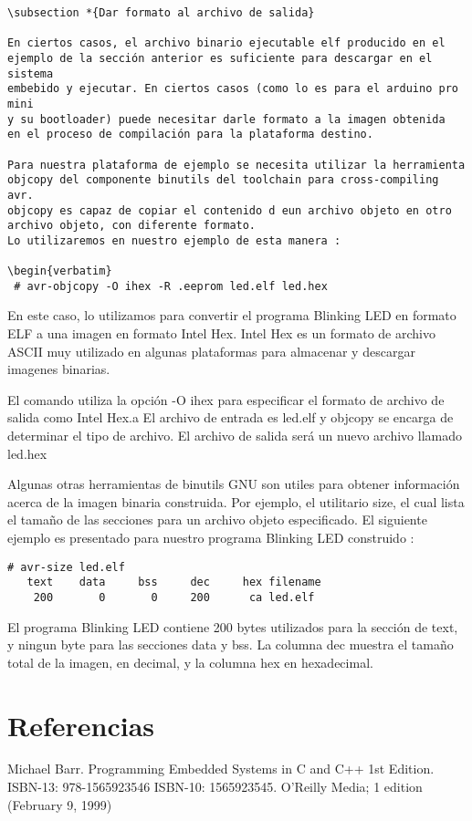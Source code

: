 \documentclass[12pt]{article}
\begin{document}
\begin{verbatim}
\subsection *{Dar formato al archivo de salida}

En ciertos casos, el archivo binario ejecutable elf producido en el 
ejemplo de la sección anterior es suficiente para descargar en el sistema 
embebido y ejecutar. En ciertos casos (como lo es para el arduino pro mini
y su bootloader) puede necesitar darle formato a la imagen obtenida
en el proceso de compilación para la plataforma destino.

Para nuestra plataforma de ejemplo se necesita utilizar la herramienta
objcopy del componente binutils del toolchain para cross-compiling avr. 
objcopy es capaz de copiar el contenido d eun archivo objeto en otro 
archivo objeto, con diferente formato.
Lo utilizaremos en nuestro ejemplo de esta manera :

\begin{verbatim}
 # avr-objcopy -O ihex -R .eeprom led.elf led.hex
\end{verbatim}

En este caso, lo utilizamos para convertir el programa Blinking LED 
en formato ELF a una imagen en formato Intel Hex. Intel Hex 
es un formato de archivo ASCII muy utilizado en algunas plataformas
para almacenar y descargar imagenes binarias.

El comando utiliza la opción -O ihex para especificar el formato 
de archivo de salida como Intel Hex.a El archivo de entrada es led.elf
y objcopy se encarga de determinar el tipo de archivo. El archivo de salida
será un nuevo archivo llamado led.hex

Algunas otras herramientas de binutils GNU son utiles para obtener 
información acerca de la imagen binaria construida.
Por ejemplo, el utilitario size, el cual lista el tamaño de las secciones
para un archivo objeto especificado. El siguiente ejemplo es presentado
para nuestro programa Blinking LED construido :

\begin{verbatim}
# avr-size led.elf
   text	   data	    bss	    dec	    hex	filename
    200	      0	      0	    200	     ca	led.elf
\end{verbatim}

El programa Blinking LED contiene 200 bytes utilizados para la sección de text, y
ningun byte para las secciones data y bss. La columna dec muestra el tamaño
total de la imagen, en decimal, y la columna hex en hexadecimal.





\section*{Referencias}

Michael Barr. Programming Embedded Systems in C and C++ 1st Edition. ISBN-13: 978-1565923546
ISBN-10: 1565923545. O'Reilly Media; 1 edition (February 9, 1999)



\end{document}
